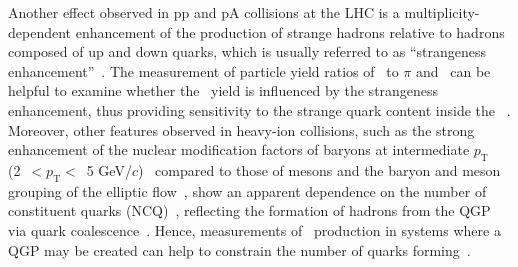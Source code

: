 Another effect observed in pp and pA collisions at the LHC is a multiplicity-dependent enhancement of the production of strange hadrons relative to hadrons composed of up and down quarks, which is usually referred to as ``strangeness enhancement''~\cite{ALICE:2016fzo}. The measurement of particle yield ratios of \fzero~to $\pi$ and \kstar~can be helpful to examine whether the \fzero~yield is influenced by the strangeness enhancement, thus providing sensitivity to the strange quark content inside the \fzero~\cite{LHCb:2014ooi, LHCb:2014vbo}. Moreover, other features observed in heavy-ion collisions, such as the strong enhancement of the nuclear modification factors of baryons at intermediate $p_{\mathrm{T}}$ (2~$<p_{\mathrm{T}}<$~5 GeV/$c$)~\cite{Fries:2003vb, ALICE:2022wpn} compared to those of mesons and the baryon and meson grouping of the elliptic flow~\cite{Wang:2022det}, show an apparent dependence on the number of constituent quarks (NCQ)~\cite{Wang:2022det}, reflecting the formation of hadrons from the QGP via quark coalescence~\cite{Fries:2003vb}. Hence, measurements of \fzero~production in systems where a QGP may be created can help to constrain the number of quarks forming~\fzero.

